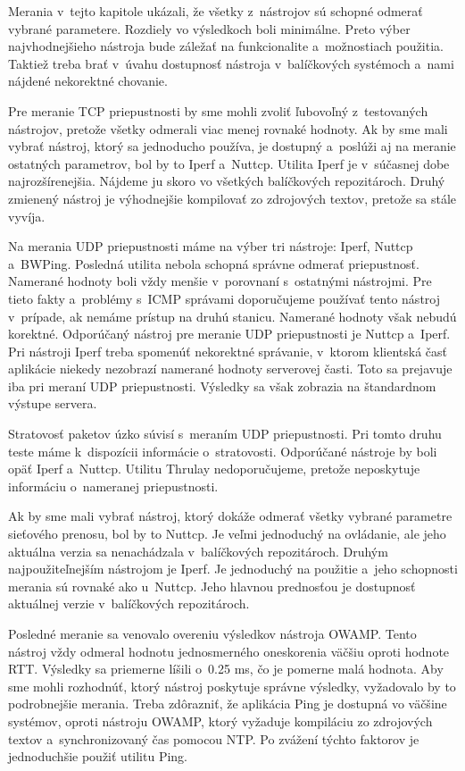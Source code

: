     Merania v~tejto kapitole
    ukázali, že všetky z~nástrojov sú schopné odmerať vybrané parametere. Rozdiely
    vo výsledkoch boli minimálne. Preto výber najvhodnejšieho nástroja bude
    záležať na funkcionalite a~možnostiach použitia. Taktiež treba brať v~úvahu
    dostupnosť nástroja v~balíčkových systémoch a~nami nájdené nekorektné chovanie.

    Pre meranie TCP priepustnosti by sme mohli zvoliť ľubovoľný z~testovaných 
    nástrojov, pretože všetky odmerali viac menej rovnaké hodnoty.
    Ak by sme mali vybrať nástroj, ktorý sa jednoducho používa, je dostupný
    a~poslúži aj na meranie ostatných parametrov, bol by to Iperf a~Nuttcp.
    Utilita Iperf je v~súčasnej dobe najrozšírenejšia. Nájdeme ju
    skoro vo všetkých balíčkových repozitároch. Druhý zmienený nástroj je
    výhodnejšie kompilovať zo zdrojových textov, pretože sa stále
    vyvíja.

    Na merania UDP priepustnosti máme na výber tri nástroje: Iperf, Nuttcp
    a~BWPing. Posledná utilita nebola schopná správne odmerať priepustnosť. 
    Namerané hodnoty boli vždy menšie v~porovnaní s~ostatnými nástrojmi. Pre
    tieto fakty a~problémy s~ICMP správami doporučujeme používať
    tento nástroj v~prípade, ak nemáme prístup na druhú stanicu. Namerané
    hodnoty však nebudú korektné. Odporúčaný nástroj pre meranie UDP
    priepustnosti je Nuttcp
    a~Iperf. Pri nástroji Iperf treba spomenúť nekorektné správanie, v~ktorom
    klientská časť aplikácie niekedy nezobrazí namerané hodnoty serverovej časti. 
    Toto sa prejavuje iba pri meraní UDP priepustnosti.
    Výsledky sa však zobrazia na štandardnom výstupe servera.

    Stratovosť paketov úzko súvisí s~meraním UDP priepustnosti. Pri
    tomto druhu teste máme k~dispozícii informácie o~stratovosti. Odporúčané nástroje
    by boli opäť Iperf a~Nuttcp. Utilitu Thrulay nedoporučujeme, pretože neposkytuje 
    informáciu o~nameranej priepustnosti.

    Ak by sme mali vybrať nástroj, ktorý dokáže odmerať všetky vybrané parametre
    sieťového prenosu, bol by to Nuttcp. Je veľmi jednoduchý na ovládanie, ale
    jeho aktuálna verzia sa nenachádzala v~balíčkových repozitároch.
    Druhým najpoužiteľnejším nástrojom 
    je Iperf. Je jednoduchý na použitie
    a~jeho schopnosti merania sú rovnaké ako u~Nuttcp. Jeho hlavnou prednosťou je 
    dostupnosť aktuálnej verzie v~balíčkových repozitároch. 

    Posledné meranie sa venovalo overeniu výsledkov nástroja OWAMP. Tento
    nástroj vždy odmeral hodnotu jednosmerného oneskorenia väčšiu oproti hodnote
    RTT. Výsledky sa priemerne líšili o~0.25 ms, čo je pomerne malá hodnota.
    Aby sme mohli rozhodnúť, ktorý nástroj poskytuje správne výsledky, vyžadovalo by to
    podrobnejšie merania.
    Treba
    zdôrazniť, že aplikácia Ping je dostupná vo väčšine systémov, oproti
    nástroju OWAMP, ktorý vyžaduje kompiláciu zo zdrojových textov
    a~synchronizovaný čas pomocou NTP. Po zvážení týchto faktorov je 
    jednoduchšie použiť utilitu Ping.

